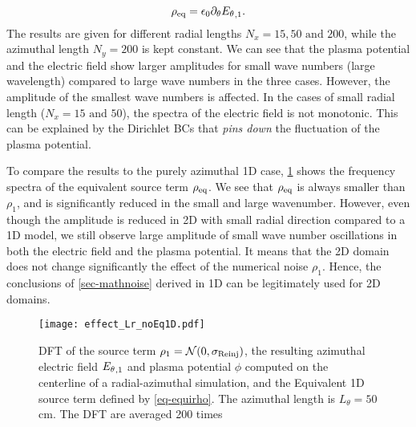       \begin{equation} \label{eq-equirho}
        \rho_{\rm eq} = \epsilon_0 \partial_\theta {\ensuremath{E_{\theta}}}_{, 1}.
      \end{equation}
      The results are given for different radial lengths $N_x=15,50 \text{ and } 200$, while the azimuthal length $N_y=200$ is kept constant.
      We can see that the plasma potential and the electric field show larger amplitudes for small wave numbers (large wavelength) compared to large wave numbers in the three cases.
      However, the amplitude of the smallest wave numbers is affected.
      In the cases of small radial length ($N_x=15 \text{ and } 50$), the spectra of the electric field is not monotonic.
      This can be explained by the Dirichlet \ac{BC}s that {\it pins down} the fluctuation of the plasma potential.
      
      To compare the results to the purely azimuthal \ac{1D} case, \cref{fig-dftLr} shows the frequency spectra of the equivalent source term $\rho_{\rm eq}$.
      We see that $\rho_{\rm eq}$ is always smaller than $\rho_1$, and is significantly reduced in the small and large wavenumber.
      However, even though the amplitude is reduced in \ac{2D} with small radial direction compared to a \ac{1D} model, we still observe large amplitude of small wave number oscillations in both the electric field and the plasma potential.
      It means that the \ac{2D} domain does not change significantly the effect of the numerical noise $\rho_1$.
      Hence, the conclusions of  \cref{sec-mathnoise} derived in \ac{1D} can be legitimately used for \ac{2D} domains.
      
      \begin{figure}[!hbt]
        \centering
        \texttt{[image: effect\_Lr\_noEq1D.pdf]}
        \caption{ DFT of the source term $\rho_1 = \mathcal{N}(0, \sigma_{\rm Reinj})$, the resulting azimuthal electric field ${E_{\theta}}_{, 1}$ and plasma potential $\phi$ computed on the centerline of a radial-azimuthal simulation, and the Equivalent \acs{1D} source term defined by \cref{eq-equirho}. The azimuthal length is $L_{\theta}=50$ cm. The \acs{DFT} are averaged 200 times  }
        \label{fig-dftLr}
        
      \end{figure}




